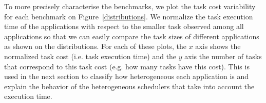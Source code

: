 To more precisely characterise the benchmarks, we plot the task cost variability for each benchmark on Figure~\ref{distributions}.
We normalize the task execution time of the applications with respect to the smaller task observed among all applications so that we can easily compare the task sizes of different applications as shown on the distributions.
For each of these plots, the $x$ axis shows the normalized task cost (i.e. task execution time) and the $y$ axis the number of tasks that correspond to this task cost (e.g. how many tasks have this cost).
This is used in the next section to classify how heterogeneous each application is and explain the behavior of the heterogeneous schedulers that take into account the execution time.



%	

